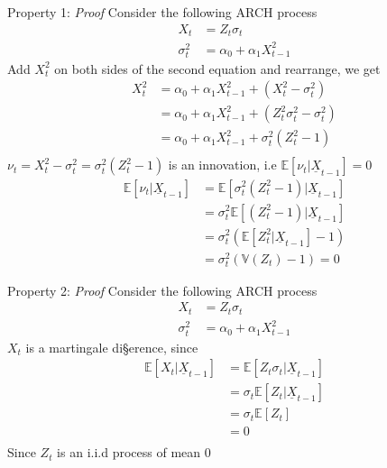 \documentclass{beamer}
\def\Esp{\mathbb{E}}
\def\Var{\mathbb{V}}
\begin{document}
\appendix
\begin{frame}{Property 1: \emph{Proof}}
    Consider the following ARCH process
    \begin{align*}
        X_t & = Z_t\sigma_t\\
        \sigma_t^2 &= \alpha_0 +\alpha_1X_{t-1}^2
    \end{align*}
    Add $X_t^2$ on both sides of the second equation and rearrange, we get
    \begin{align*}
        X_t^2 &= \alpha_0 +\alpha_1X_{t-1}^2 + (X_t^2 - \sigma_t^2)\\
              &= \alpha_0 +\alpha_1X_{t-1}^2 + (Z_t^2\sigma_t^2 - \sigma_t^2)\\  
              & = \alpha_0 +\alpha_1X_{t-1}^2 + \sigma_t^2(Z_t^2 - 1)\\   
    \end{align*}
    $\nu_t= X_t^2 - \sigma_t^2 = \sigma_t^2(Z_t^2 - 1)$ is an innovation, i.e $\Esp[\nu_t|\underline{X}_{t-1}]=0$
    \begin{align*}
        \Esp[\nu_t|\underline{X}_{t-1}] &= \Esp[\sigma_t^2(Z_t^2 - 1)|\underline{X}_{t-1}]\\
                                        &= \sigma_t^2 \Esp[(Z_t^2 - 1)|\underline{X}_{t-1}]\\
                                        &= \sigma_t^2 ( \Esp[Z_t^2|\underline{X}_{t-1}]-1)\\
                                        &= \sigma_t^2 (\Var(Z_t) - 1)  = 0
    \end{align*}
\end{frame}

\begin{frame}{Property 2: \emph{Proof}}
    Consider the following ARCH process
    \begin{align*}
        X_t & = Z_t\sigma_t\\
        \sigma_t^2 &= \alpha_0 +\alpha_1X_{t-1}^2
    \end{align*}
    $X_t$ is a martingale di§erence, since
    \begin{align*}
        \Esp[X_t|\underline{X}_{t-1}] &= \Esp[Z_t\sigma_t|\underline{X}_{t-1}]\\
                                      &= \sigma_t\Esp[Z_t|\underline{X}_{t-1}]\\
                                      &= \sigma_t\Esp[Z_t]\\
                                      &= 0\\
    \end{align*}
    Since $Z_t$ is an i.i.d process of mean 0
\end{frame}
\end{document}
